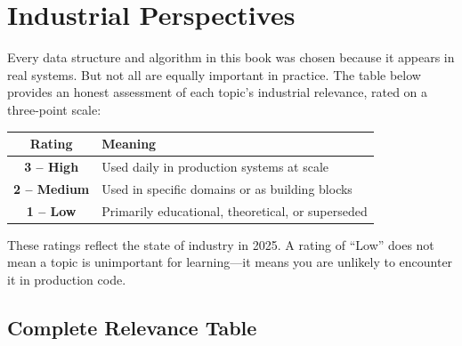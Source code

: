 \section{Industrial Perspectives}

Every data structure and algorithm in this book was chosen because it appears in real systems. But not all are equally important in practice. The table below provides an honest assessment of each topic's industrial relevance, rated on a three-point scale:

\begin{center}
\begin{tabular}{cl}
\toprule
Rating & Meaning \\
\midrule
\textbf{3 -- High} & Used daily in production systems at scale \\
\textbf{2 -- Medium} & Used in specific domains or as building blocks \\
\textbf{1 -- Low} & Primarily educational, theoretical, or superseded \\
\bottomrule
\end{tabular}
\end{center}

These ratings reflect the state of industry in 2025. A rating of ``Low'' does not mean a topic is unimportant for learning---it means you are unlikely to encounter it in production code.


\subsection{Complete Relevance Table}

